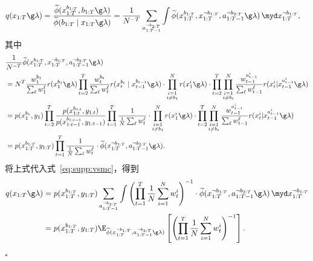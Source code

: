 \begin{align}
&q(x_{1:T}\g\lambda) = 
\frac{\widetilde\phi(x_{1:T}^{b_{1:T}},b_{1:T}\g\lambda)}{\widetilde\phi(b_{1:T}\mid x_{1:T}\g\lambda)} 
=\frac{1}{N^{-T}}  \sum_{a_{1:T-1}^{\neg b_{2:T}}}\int 
\widetilde\phi(x_{1:T}^{b_{1:T}},x_{1:T}^{\neg 
b_{1:T}},a_{1:T-1}^{\neg b_{2:T}} \g\lambda)
\,\myd x_{1:T}^{\neg b_{1:T}},
\label{eq:supp:vsmc}
\end{align}
其中
\begin{align*}
&\frac{1}{N^{-T}}  \widetilde\phi(x_{1:T}^{b_{1:T}},x_{1:T}^{\neg b_{1:T}},a_{1:T-1}^{\neg b_{2:T}} \g\lambda) \\
&= N^T  
\frac{w_1^{b_1}}{\sum_\ell w_1^\ell}r(x_1^{b_1}\g\lambda)\prod_{t=2}^T 
\frac{w_t^{b_t}}{\sum_\ell w_t^\ell} r(x_t^{b_t}\mid 
x_{t-1}^{b_{t-1}}\g\lambda) \cdot
\prod_{\substack{i=1 \\ i\neq b_1}}^N r(x_1^i\g\lambda) \cdot \prod_{t=2}^T 
\prod_{\substack{i=1 \\ i\neq b_t}}^N
\frac{w_{t-1}^{a_{t-1}^i}}{\sum_\ell w_{t-1}^\ell} r(x_t^i | 
x_{t-1}^{a_{t-1}^i}\g\lambda) \\
&= p(x_1^{b_1},y_1)\prod_{t=2}^T 
\frac{p(x_{1:t}^{b_{1:t}},y_{1:t})}{p(x_{1:t-1}^{b_{1:t-1}},y_{1:t-1})}
\prod_{t=1}^T \frac{1}{\frac{1}{N} \sum_\ell w_t^\ell} \cdot
\prod_{\substack{i=1 \\ i\neq b_1}}^N r(x_1^i\g\lambda) \cdot \prod_{t=2}^T 
\prod_{\substack{i=1 \\ i\neq b_t}}^N
\frac{w_{t-1}^{a_{t-1}^i}}{\sum_\ell w_{t-1}^\ell} r(x_t^i | 
x_{t-1}^{a_{t-1}^i}\g\lambda) \\
&= p(x_{1:T}^{b_{1:T}},y_{1:T}) \prod_{t=1}^T \frac{1}{\frac{1}{N} \sum_\ell w_t^\ell}
\cdot \widetilde\phi(x_{1:T}^{\neg b_{1:T}},a_{1:T-1}^{\neg b_{2:T}} \g\lambda).
\end{align*}
将上式代入式~\eqref{eq:supp:vsmc}，得到
\begin{align}\label{eq:supp:dist}
q(x_{1:T}\g\lambda) &= p(x_{1:T}^{b_{1:T}},y_{1:T})
\sum_{a_{1:T-1}^{\neg b_{2:T}}}\int \left(
\prod_{t=1}^T \frac{1}{N} \sum_{i=1}^N w_t^i \right)^{-1}
\cdot \widetilde\phi(x_{1:T}^{\neg b_{1:T}},a_{1:T-1}^{\neg b_{2:T}} \g\lambda)
\,\myd x_{1:T}^{\neg b_{1:T}} \nonumber \\
&= p(x_{1:T}^{b_{1:T}},y_{1:T})
\E_{\widetilde\phi(x_{1:T}^{\neg b_{1:T}},a_{1:T-1}^{\neg b_{2:T}} \g\lambda)}
\left[ \left(
\prod_{t=1}^T \frac{1}{N} \sum_{i=1}^N w_t^i \right)^{-1}\right].
\end{align}
\hfill$\square$


